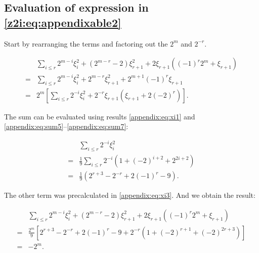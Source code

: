 \subsection{Evaluation of expression in \eqref{z2i:eq:appendixable2}}

Start by rearranging the terms and factoring out the $2^m$ and $2^{-r}$.

\begin{equation}
	\label{appendix:eq:2step1}
	\begin{split}
		& \sum\limits_{i\leq r} 2^{m-i} \xi_i^2
			+ (2^{m-r}-2) \xi_{r+1}^2 + 2\xi_{r+1}((-1)^r 2^m + \xi_{r+1}) \\
			= & \sum\limits_{i\leq r} 2^{m-i} \xi_i^2
				+ 2^{m-r}\xi_{r+1}^2 + 2^{m+1} (-1)^r \xi_{r+1} \\
			= & 2^m \left[
				\sum\limits_{i\leq r} 2^{-i} \xi_i^2
					+ 2^{-r}\xi_{r+1} \left(
						\xi_{r+1} + 2 (-2)^r 
					\right)
			\right].
	\end{split}
\end{equation}

The sum can be evaluated using results \eqref{appendix:eq:xi1} and
\eqref{appendix:eq:sum5}--\eqref{appendix:eq:sum7}:

\begin{equation}
	\begin{split}
		& \sum\limits_{i\leq r} 2^{-i} \xi_i^2 \\
		= & \frac 1 9 \sum\limits_{i\leq r} 2^{-i} \left(
			1 + (-2)^{i+2} + 2^{2i+2}
		\right) \\
		= & \frac 1 9 \left(
			2^{r+3} - 2^{-r} + 2(-1)^r - 9
		\right).
	\end{split}
\end{equation}

The other term was precalculated in \eqref{appendix:eq:xi3}. And we obtain 
the result:

\begin{equation}
	\begin{split}
		& \sum\limits_{i\leq r} 2^{m-i} \xi_i^2
			+ (2^{m-r}-2) \xi_{r+1}^2 + 2\xi_{r+1}((-1)^r 2^m + \xi_{r+1}) \\
		= & \frac {2^m} 9 \left[
			2^{r+3} - 2^{-r} + 2(-1)^r - 9
			+ 2^{-r} \left(
				1 + (-2)^{r+1} + (-2)^{2r+3}
			\right)
		\right] \\
		= & -2^m.
	\end{split}
\end{equation}
